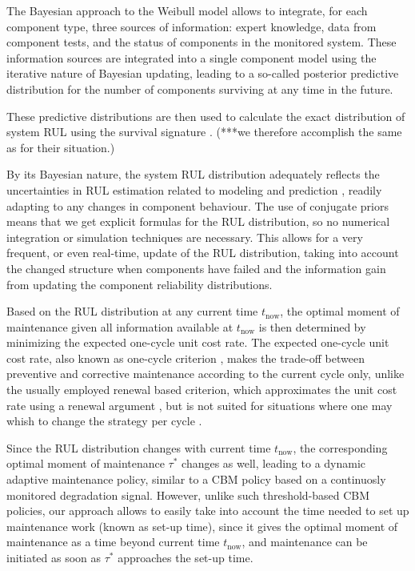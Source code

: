 \documentclass[authoryear]{elsarticle}
\def\tnow{t_\text{now}}
\begin{document}
The Bayesian approach to the Weibull model \citep[see, e.g.,][]{1996:mazzuchi-soyer} allows to integrate, for each component type,
three sources of information: expert knowledge, data from component tests,
and the status of components in the monitored system. %
These information sources are integrated into a single component model
using the iterative nature of Bayesian updating,
leading to a so-called posterior predictive distribution for the number of components surviving at any time in the future.

These predictive distributions are then used to calculate the exact distribution of system RUL
using the survival signature \citep{2012:survsign}.
(***we therefore accomplish the same as \cite{2013:si-et-al} for their situation.)

By its Bayesian nature, the system RUL distribution adequately reflects the uncertainties in RUL estimation
related to modeling and prediction \citep{2015:sankararaman},
readily adapting to any changes in component behaviour.
The use of conjugate priors means that we get explicit formulas for the RUL distribution,
so no numerical integration or simulation techniques are necessary.
This allows for a very frequent, or even real-time, update of the RUL distribution,
taking into account the changed structure when components have failed
and the information gain from updating the component reliability distributions.

Based on the RUL distribution at any current time $\tnow$,
the optimal moment of maintenance given all information available at $\tnow$
is then determined by minimizing the expected one-cycle unit cost rate.
The expected one-cycle unit cost rate, also known as one-cycle criterion
\citep{1984:ansell-bendell-humble,1996:mazzuchi-soyer,2006:coolen-schrijner-coolen},
makes the trade-off between preventive and corrective maintenance according to the current cycle only,
unlike the usually employed renewal based criterion,
which approximates the unit cost rate using a renewal argument \citep[p.~296]{1996:mazzuchi-soyer},
but is not suited for situations where one may whish to change the strategy per cycle \citep{2006:coolen-schrijner-coolen}.

Since the RUL distribution changes with current time $\tnow$,
the corresponding optimal moment of maintenance $\tau^*$ changes as well,
leading to a dynamic adaptive maintenance policy,
similar to a CBM policy based on a continuosly monitored degradation signal.
However, unlike such threshold-based CBM policies,
our approach allows to easily take into account the time needed to set up maintenance work (known as set-up time),
since it gives the optimal moment of maintenance as a time beyond current time $\tnow$,
and maintenance can be initiated as soon as $\tau^*$ approaches the set-up time.
\end{document}
